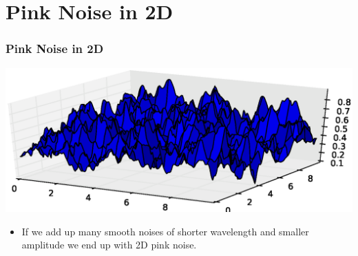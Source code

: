 \documentclass[slidestop,xcolor=pst,dvips]{beamer}
\newcommand{\sect}[1]{
\section{#1}
\begin{frame}[fragile]\frametitle{#1}
}
\begin{document}
\sect{Pink Noise in 2D}
\includegraphics[width=\textwidth]{pinknoisesurface.eps}
\begin{itemize}
\item If we add up many smooth noises of shorter wavelength and
  smaller amplitude we end up with 2D pink noise.

\end{itemize}
\end{frame}
\end{document}
